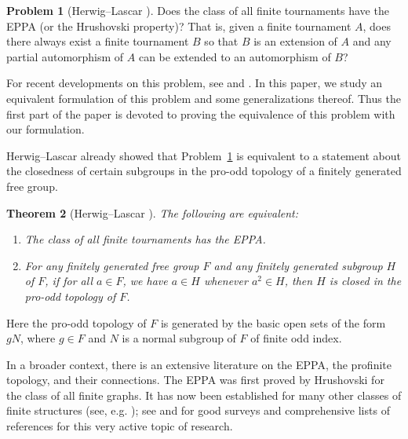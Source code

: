 \documentclass[11pt]{amsart}
\newtheorem{theorem}{Theorem}[section]
\theoremstyle{definition}
\newtheorem{problem}[theorem]{Problem}
\theoremstyle{definition}
\numberwithin{equation}{section}
\begin{document}
\begin{problem} [Herwig--Lascar \cite{HL00}]\label{prob:1.1} Does the class of all finite tournaments have the EPPA (or the Hrushovski property)? That is, given a finite tournament $A$, does there always exist a finite tournament $B$ so that $B$ is an extension of $A$ and any partial automorphism of $A$ can be extended to an automorphism of $B$?
\end{problem}

For recent developments on this problem, see \cite{HPSW19} and \cite{HJKS25}. In this paper, we study an equivalent formulation of this problem and some generalizations thereof. Thus the first part of the paper is devoted to proving the equivalence of this problem with our formulation.

Herwig--Lascar \cite[Section 6]{HL00} already showed that Problem~\ref{prob:1.1} is equivalent to a statement about the closedness of certain subgroups in the pro-odd topology of a finitely generated free group.

\begin{theorem}[Herwig--Lascar \cite{HL00}]\label{thm:HL00} The following are equivalent:
\begin{enumerate}
\item[\rm (a)] The class of all finite tournaments has the EPPA.
\item[\rm (b)] For any finitely generated free group $F$ and any finitely generated subgroup $H$ of $F$, if for all $a\in F$, we have $a\in H$ whenever $a^2\in H$, then $H$ is closed in the pro-odd topology of $F$.
\end{enumerate}
\end{theorem}

Here the pro-odd topology of $F$ is generated by the basic open sets of the form $gN$, where $g\in F$ and $N$ is a normal subgroup of $F$ of finite odd index.

In a broader context, there is an extensive literature on the EPPA, the profinite topology, and their connections. The EPPA was first proved by Hrushovski \cite{Hr92} for the class of all finite graphs. It has now been established for many other classes of finite structures (see, e.g. \cite{He95, HL00, So05, Co19, HPSW19, EHKN20, Ko20, HKN22, HJKS25}); see \cite{HKN22} and \cite{HJKS25} for good surveys and comprehensive lists of references for this very active topic of research. 
\end{document}
